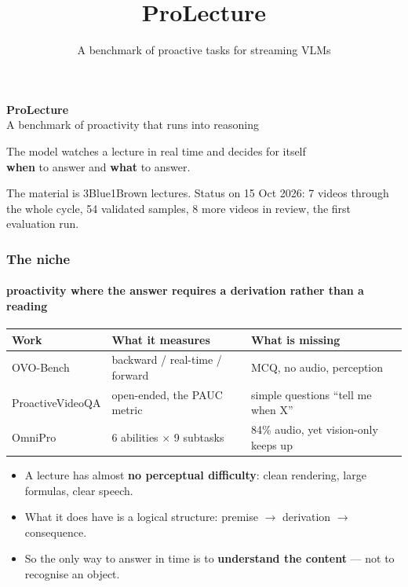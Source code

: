 \documentclass[aspectratio=169,10pt]{beamer}
\title{ProLecture}
\subtitle{A benchmark of proactive tasks for streaming VLMs}
\date{}
\newcommand{\lead}[1]{{\color{warm}\textbf{#1}}}
\begin{document}
\begin{frame}[plain]
  \vspace{1.2cm}
  {\Huge\bfseries ProLecture}\\[0.5em]
  {\large\color{muted} A benchmark of proactivity that runs into reasoning}\\[2.2em]

  \begin{minipage}{0.9\textwidth}
    \color{ink}
    The model watches a lecture in real time and decides for itself\\
    \lead{when} to answer and \lead{what} to answer.
  \end{minipage}

  \vfill
  {\color{muted}\small The material is 3Blue1Brown lectures. Status on 15 Oct 2026: 7 videos through the whole cycle, 54 validated samples, 8 more videos in review, the first evaluation run.}
  \vspace{0.8cm}
\end{frame}

\begin{frame}
  \frametitle{The niche}
  \framesubtitle{proactivity where the answer requires a derivation rather than a reading}

  \begin{center}
  \footnotesize
  \begin{tabular}{@{}lll@{}}
    \toprule
    \textbf{Work} & \textbf{What it measures} & \textbf{What is missing} \\
    \midrule
    OVO-Bench & backward / real-time / forward & MCQ, no audio, perception \\
    ProactiveVideoQA & open-ended, the PAUC metric & simple questions ``tell me when X'' \\
    OmniPro & 6 abilities $\times$ 9 subtasks & 84\% audio, yet vision-only keeps up \\
    \bottomrule
  \end{tabular}
  \end{center}

  \vspace{0.8em}
  \begin{itemize}
    \item A lecture has almost \textbf{no perceptual difficulty}: clean rendering, large formulas, clear speech.
    \item What it does have is a logical structure: premise $\rightarrow$ derivation $\rightarrow$ consequence.
    \item So the only way to answer in time is to \lead{understand the content} — not to recognise an object.
  \end{itemize}
\end{frame}
\end{document}
